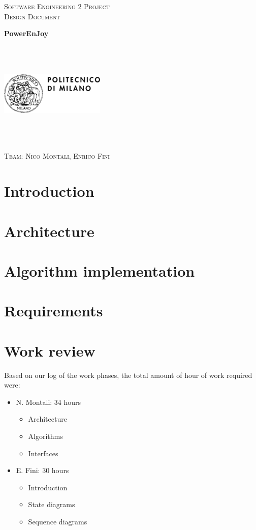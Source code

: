 \documentclass[a4paper,12pt,oneside]{book}
\begin{document}
	
	\pagestyle{empty}\centering
	\textsc{\Large Software Engineering 2 Project\\}
	\textsc{Design Document}

	\vfill

	\textbf{\Huge PowerEnJoy}
	
	\vfill
	\begin{center}	
	\includegraphics[width=5cm,height=5cm,keepaspectratio]{polimi}
	\end{center}
	\textsc{\Large Team: Nico Montali, Enrico Fini}
	
	\tableofcontents
	
	\clearpage
	

	\begin{flushleft}
	\chapter{Introduction}\label{cap:Intro}
	
	\chapter{Architecture}\label{cap:Archi}
	
	\chapter{Algorithm implementation}\label{cap:Algo}
	
	\chapter{Requirements}\label{cap:Req}
	
	\chapter{Work review}
	Based on our log of the work phases, the total amount of hour of work required were:
	\begin{itemize}
	\item N. Montali: 34 hours \begin{itemize}
		\item Architecture
		\item Algorithms
		\item Interfaces
	\end{itemize}
	\item E. Fini: 30 hours\begin{itemize}
		\item Introduction
		\item State diagrams
		\item Sequence diagrams
	\end{itemize}
	\end{itemize}
	\end{flushleft}
\end{document}
